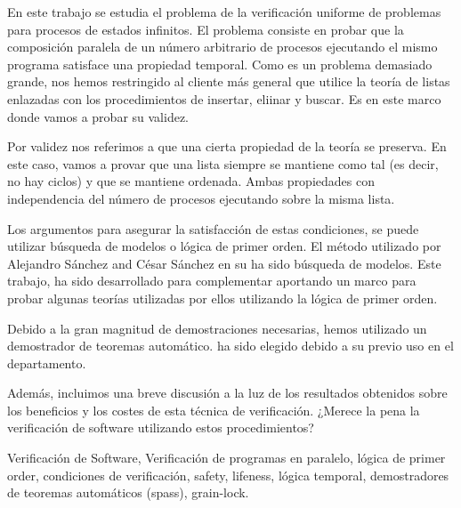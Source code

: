 \begin{abstractEs}
En este trabajo se estudia el problema de la verificación uniforme de problemas para procesos de estados infinitos. El problema consiste en probar que la composición paralela de un número arbitrario de procesos ejecutando el mismo programa satisface una propiedad temporal. Como es un problema demasiado grande, nos hemos restringido al cliente más general que utilice la teoría de listas enlazadas con los procedimientos de insertar, eliinar y buscar. Es en este marco donde vamos a probar su validez.

Por validez nos referimos a que una cierta propiedad de la teoría se preserva. En este caso, vamos a provar que una lista siempre se mantiene como tal (es decir, no hay ciclos) y que se mantiene ordenada. Ambas propiedades con independencia del número de procesos ejecutando sobre la misma lista.

Los argumentos para asegurar la satisfacción de estas condiciones, se puede utilizar búsqueda de modelos o lógica de primer orden. El método utilizado por Alejandro Sánchez and César Sánchez en su  ha sido búsqueda de modelos. Este trabajo, ha sido desarrollado para complementar  aportando un marco para probar algunas teorías utilizadas por ellos utilizando la lógica de primer orden.

Debido a la gran magnitud de demostraciones necesarias, hemos utilizado un demostrador de teoremas automático.  ha sido elegido debido a su previo uso en el departamento.

Además, incluimos una breve discusión a la luz de los resultados obtenidos sobre los beneficios y los costes de esta técnica de verificación. ¿Merece la pena la verificación de software utilizando estos procedimientos?


\end{abstractEs}

\begin{keywordsEs}
Verificación de Software, Verificación de programas en paralelo, lógica de primer order, condiciones de verificación, safety, lifeness, lógica temporal, demostradores de teoremas automáticos (spass), grain-lock.
\end{keywordsEs}
